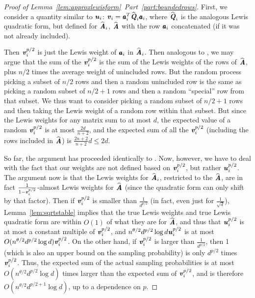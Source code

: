 \begin{proof}[Proof of Lemma~\ref{lem:approxlewisform}~Part~\ref{part:boundedrows}]

First, we consider a quantity similar to $\uu_i$: $\vv_i = \aa_i^T \widehat \QQ_i \aa_i$, where $\widehat \QQ_i$ is the
analogous Lewis quadratic form, but defined for $\widehat \AA_i$, $\widehat \AA$ with the row $\aa_i$ concatenated (if it was not already included).

Then $\vv_i^{p/2}$ is just the Lewis weight of $\aa_i$ in $\widehat \AA_i$.  Then analogous to \cite{CohenLMMPS14:arxiv}, we may argue
that the sum of the $\vv_i^{p/2}$ is the sum of the Lewis weights of the rows of $\widehat \AA$, plus $n/2$ times the average weight
of unincluded rows.  But the random process picking a subset of $n/2$ rows and then a random unincluded row is the same as picking
a random subset of $n/2+1$ rows and then a random ``special'' row from that subset.  We thus want to consider picking a random
subset of $n/2+1$ rows and then taking the Lewis weight of a random row within that subset.  But since the Lewis weights
for any matrix sum to at most $d$, the expected value of a random $\vv_i^{p/2}$ is at most $\frac{2d}{n+2}$, and the expected
sum of all the $\vv_i^{p/2}$ (including the rows included in $\widehat \AA$) is $\frac{2n+2}{n+2} d \leq 2d$.

So far, the argument has proceeded identically to \cite{CohenLMMPS14:arxiv}.  Now, however, we have to deal with the fact
that our weights are not defined based on $\vv_i^{p/2}$, but rather $\uu_i^{p/2}$.  The argument now is that
the Lewis weights for $\widehat \AA_i$, restricted to the $\widehat \AA$, are in fact $\frac{1}{1-\vv_i^{p/2}}$-almost
Lewis weights for $\widehat \AA$ (since the quadratic form can only shift by that factor).  Then if $\vv_i^{p/2}$ is smaller
than $\frac{1}{d^{p/2}}$ (in fact, even just for $\frac{1}{\sqrt{d}}$), Lemma~\ref{lem:sqrtstable} implies that
the true Lewis weights and true Lewis quadratic form are within $O(1)$ of what they are for $\widehat \AA$, and thus
that $\uu_i^{p/2}$ is at most a constant multiple of $\vv_i^{p/2}$, and $n^{\theta / 2} d^{p/2} \log d \uu_i^{p/2}$
is at most $O(n^{\theta / 2} d^{p/2} \log d) \vv_i^{p/2}$.  On the other hand, if $\vv_i^{p/2}$ is larger than
$\frac{1}{d^{p/2}}$, then 1 (which is also an upper bound on the sampling probability) is only
$d^{p/2}$ times $\vv_i^{p/2}$.  Thus, the expected sum of the actual sampling probabilities is at most
$O(n^{\theta / 2} d^{p/2} \log d)$ times larger than the expected sum of $\vv_i^{p/2}$, and is therefore
$O(n^{\theta /2} d^{p/2 + 1} \log d)$, up to a dependence on $p$.
\end{proof}

